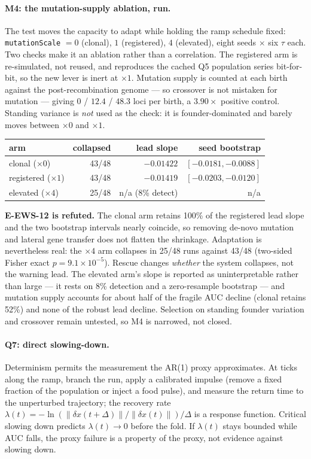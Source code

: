 \documentclass[11pt,a4paper]{article}
\begin{document}
\paragraph{M4: the mutation-supply ablation, run.} The test moves the capacity to
adapt while holding the ramp schedule fixed: \texttt{mutationScale} $=0$ (clonal),
$1$ (registered), $4$ (elevated), eight seeds $\times$ six $\tau$ each. Two checks
make it an ablation rather than a correlation. The registered arm is re-simulated,
not reused, and reproduces the cached Q5 population series bit-for-bit, so the new
lever is inert at $\times 1$. Mutation supply is counted at each birth against the
post-recombination genome --- so crossover is not mistaken for mutation --- giving
$0$ / $12.4$ / $48.3$ loci per birth, a $3.90\times$ positive control. Standing
variance is \emph{not} used as the check: it is founder-dominated and barely moves
between $\times0$ and $\times1$.

\begin{table}[h]\centering\small
\begin{tabular}{lrrr}
\toprule
arm & collapsed & lead slope & seed bootstrap \\
\midrule
clonal ($\times0$) & 43/48 & $-0.01422$ & $[-0.0181, -0.0088]$ \\
registered ($\times1$) & 43/48 & $-0.01419$ & $[-0.0203, -0.0120]$ \\
elevated ($\times4$) & 25/48 & n/a (8\% detect) & n/a \\
\bottomrule
\end{tabular}
\end{table}

\textbf{E-EWS-12 is refuted.} The clonal arm retains 100\% of the registered lead
slope and the two bootstrap intervals nearly coincide, so removing de-novo
mutation and lateral gene transfer does not flatten the shrinkage. Adaptation is
nevertheless real: the $\times4$ arm collapses in 25/48 runs against 43/48
(two-sided Fisher exact $p = 9.1\times10^{-5}$). Rescue changes \emph{whether} the
system collapses, not the warning lead. The elevated arm's slope is reported as
uninterpretable rather than large --- it rests on 8\% detection and a
zero-resample bootstrap --- and mutation supply accounts for about half of the
fragile AUC decline (clonal retains 52\%) and none of the robust lead decline.
Selection on standing founder variation and crossover remain untested, so M4 is
narrowed, not closed.

\paragraph{Q7: direct slowing-down.} Determinism permits the measurement the
AR(1) proxy approximates. At ticks along the ramp, branch the run, apply a
calibrated impulse (remove a fixed fraction of the population or inject a food
pulse), and measure the return time to the unperturbed trajectory; the recovery
rate $\lambda(t) = -\ln(\|\delta x(t+\Delta)\|/\|\delta x(t)\|)/\Delta$ is a
response function. Critical slowing down predicts $\lambda(t) \to 0$ before the
fold. If $\lambda(t)$ stays bounded while AUC falls, the proxy failure is a
property of the proxy, not evidence against slowing down.
\end{document}
